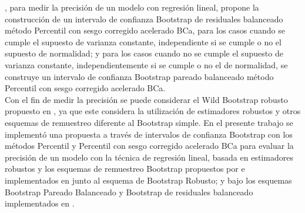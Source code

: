 \textcite{balam-2012}, para medir la precisión de un modelo con regresión lineal, propone la construcción de un intervalo de confianza Bootstrap de residuales balanceado método Percentil con sesgo corregido acelerado BCa, para los casos cuando se cumple el supuesto de varianza constante, independiente si se cumple o no el supuesto de normalidad; y para los casos cuando no se cumple el supuesto de varianza constante, independientemente si se cumple o no el de normalidad, se construye un intervalo de confianza Bootstrap pareado balanceado método Percentil con sesgo corregido acelerado BCa.\\

Con el fin de medir la precisión se puede considerar el Wild Bootstrap robusto propuesto en \textcite{rana-2012}, ya que este considera la utilización de estimadores robustos y otros esquemas de remuestreo diferente al Bootstrap simple.
En el presente trabajo se implementó una propuesta a través de intervalos de confianza Bootstrap con los métodos Percentil y Percentil con sesgo corregido acelerado BCa para evaluar la precisión de un modelo con la técnica de regresión lineal, basada en estimadores robustos y los esquemas de remuestreo Bootstrap propuestos por \textcite{rana-2012} e implementados en \textcite{zacarias-2023} junto al esquema de Bootstrap Robusto; y bajo los esquemas Bootstrap Pareado Balanceado y Bootstrap de residuales balanceado implementados en \textcite{balam-2012}.\\
